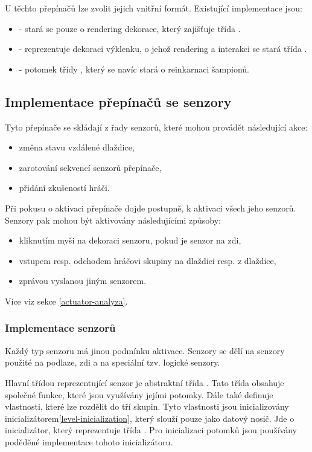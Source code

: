 U těchto přepínačů lze zvolit jejich vnitřní formát. Existující implementace jsou:
\begin{itemize}
\item {} - stará se pouze o rendering dekorace, který zajišťuje třída . 
\item {} - reprezentuje dekoraci výklenku, o jehož rendering a interakci se stará třída . 
\item {} - potomek třídy , který se navíc stará o reinkarnaci šampionů.
\end{itemize}

\subsection{Implementace přepínačů se senzory}
Tyto přepínače se skládají z řady senzorů, které mohou provádět následující akce:

\begin{itemize}
\item změna stavu vzdálené dlaždice,
\item zarotování sekvencí senzorů přepínače,
\item přidání zkušeností hráči.
\end{itemize}

Při pokusu o aktivaci přepínače dojde postupně, k aktivaci všech jeho senzorů.
Senzory pak mohou být aktivovány následujícími způsoby:

\begin{itemize}
\item kliknutím myši na dekoraci senzoru, pokud je senzor na zdi, 
\item vstupem resp. odchodem hráčovi skupiny na dlaždici resp. z dlaždice, 
\item zprávou vyslanou jiným senzorem.
\end{itemize}

Více viz sekce \ref{actuator-analyza}.

\subsubsection{Implementace senzorů}

Každý typ senzoru má jinou podmínku aktivace. Senzory se dělí na senzory použité na podlaze, zdi a
na speciální tzv. logické senzory.

Hlavní třídou reprezentující senzor je abstraktní třída . Tato třída obsahuje společné funkce,
které jsou využívány jejími potomky. Dále také definuje vlastnosti, které lze rozdělit do tří skupin.
Tyto vlastnosti jsou inicializovány inicializátorem\vref{level-inicialization}, který slouží pouze jako datový nosič.
Jde o inicializátor, který reprezentuje třída . Pro inicializaci potomků jsou 
používány poděděné implementace tohoto inicializátoru.

